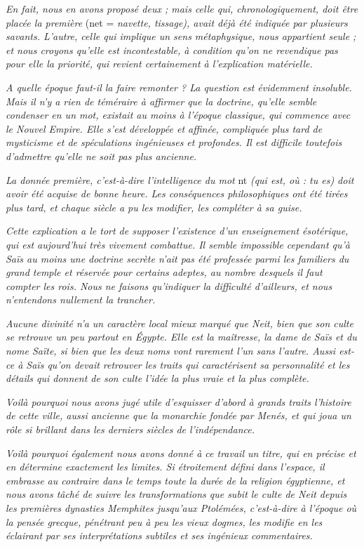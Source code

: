 \documentclass[a4paper, 11pt, oneside]{article}
\begin{document}
\emph{En fait, nous en avons proposé deux ; mais celle qui, chronologiquement, doit être placée la première} (net = \emph{navette, tissage), avait déjà été indiquée par plusieurs savants. L'autre, celle qui implique un sens métaphysique, nous appartient seule ; et nous croyons qu'elle est incontestable, à condition qu'on ne revendique pas pour elle la priorité, qui revient certainement à l'explication matérielle.}

\emph{A quelle époque faut-il la faire remonter ? La question est évidemment insoluble. Mais il n'y a rien de téméraire à affirmer que la doctrine, qu'elle semble condenser en un mot, existait au moins à l'époque classique, qui commence avec le Nouvel Empire. Elle s'est développée et affinée, compliquée plus tard de mysticisme et de spéculations ingénieuses et profondes. Il est difficile toutefois d'admettre qu'elle ne soit pas plus ancienne.}

\emph{La donnée première, c'est-à-dire l'intelligence du mot} nt \emph{(qui est, où : tu es) doit avoir été acquise de bonne heure. Les conséquences philosophiques ont été tirées plus tard, et chaque siècle a pu les modifier, les compléter à sa guise.}

\emph{Cette explication a le tort de supposer l'existence d'un enseignement ésotérique, qui est aujourd'hui très vivement combattue. Il semble impossible cependant qu'à Saïs au moins
une doctrine secrète n'ait pas été professée parmi les familiers du grand temple et réservée pour certains adeptes, au nombre desquels il faut compter les rois. Nous ne faisons qu'indiquer la difficulté d'ailleurs, et nous n'entendons nullement la trancher.}

\emph{Aucune divinité n'a un caractère local mieux marqué que Neit, bien que son culte se retrouve un peu partout en Égypte. Elle est la maîtresse, la dame de Saïs et du nome Saïte, si bien que les deux noms vont rarement l'un sans l'autre. Aussi est-ce à Saïs qu'on devait retrouver les traits qui caractérisent sa personnalité et les détails qui donnent de son culte l'idée la plus vraie et la plus complète.}

\emph{Voilà pourquoi nous avons jugé utile d'esquisser d'abord à grands traits l'histoire de cette ville, aussi ancienne que la monarchie fondée par Menés, et qui joua un rôle si brillant dans les derniers siècles de l'indépendance.}

\emph{Voilà pourquoi également nous avons donné à ce travail un titre, qui en précise et en détermine exactement les limites. Si étroitement défini dans l'espace, il embrasse au contraire dans le temps toute la durée de la religion égyptienne, et nous avons tâché de suivre les transformations que subit le culte de Neit depuis les premières dynasties Memphites jusqu'aux Ptolémées, c'est-à-dire à l'époque où la pensée grecque, pénétrant peu à peu les vieux dogmes, les modifie en les éclairant par ses interprétations subtiles et ses ingénieux commentaires.}
\end{document}
